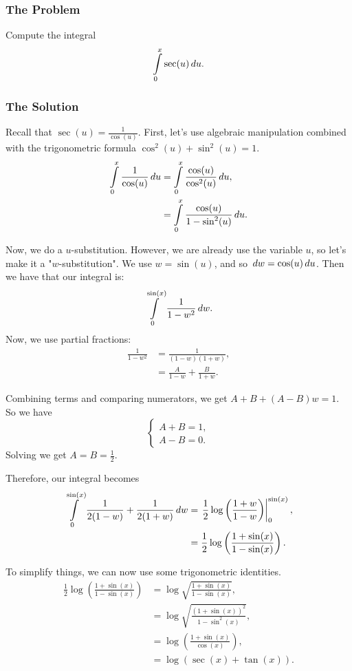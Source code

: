 \subsubsection*{The Problem}

Compute the integral
\begin{equation}
\int\limits_0^x \sec(u) \, du.
\end{equation}

\subsubsection*{The Solution}

Recall that \(\sec(u) = \frac{1}{\cos(u)}\). First, let's use algebraic manipulation combined with the trigonometric formula \(\cos^2(u) + \sin^2(u) = 1\).
\begin{align}
\int\limits_0^x \frac{1}{\cos(u)} \, du & = \int\limits_0^x \frac{\cos(u)}{\cos^2(u)} \, du, \\
    & = \int\limits_0^x \frac{\cos(u)}{1 - \sin^2(u)} \, du.
\end{align}

Now, we do a \(u\)-substitution. However, we are already use the variable \(u\), so let's make it a "\(w\)-substitution". 
We use \(w = \sin(u)\), and so \(\, dw = \cos(u) \, du\). Then we have that our integral is:
\begin{equation}
\int\limits_0^{\sin(x)} \frac{1}{1 - w^2} \, dw.
\end{equation}
 Now, we use partial fractions: 
\begin{align}
\frac{1}{1 - w^2} & = \frac{1}{(1 - w)(1 + w)},\\
    & = \frac{A}{1 - w} + \frac{B}{1 + w}.
\end{align}

Combining terms and comparing numerators, we get \(A + B + (A - B)w = 1\). So we have
\begin{equation}
\begin{cases}
A + B = 1, \\
A - B = 0.
\end{cases}
\end{equation}
Solving we get \(A = B = \frac{1}{2}\).

Therefore, our integral becomes
\begin{align}
\int\limits_0^{\sin(x)} \frac{1}{2(1 - w)} + \frac{1}{2(1 + w)} \, dw 
    & = \left. \frac{1}{2} \log\left(\frac{1 + w}{1 - w}\right)\right|_0^{\sin(x)}, \\
    & = \frac{1}{2} \log\left(\frac{1 + \sin(x)}{1 - \sin(x)}\right).
\end{align}

To simplify things, we can now use some trigonometric identities.
\begin{align}
\frac{1}{2} \log\left(\frac{1 + \sin(x)}{1 - \sin(x)}\right) & = \log\sqrt{\frac{1 + \sin(x)}{1 - \sin(x)}}, \\
    & = \log\sqrt{\frac{(1 + \sin(x))^2}{1 - \sin^2(x)}}, \\
    & = \log\left(\frac{1 + \sin(x)}{\cos(x)}\right), \\
    & = \log(\sec(x) + \tan(x)).
\end{align}
